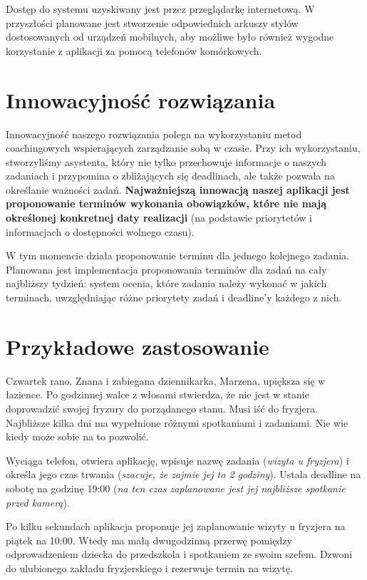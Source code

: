 \documentclass[pdflatex,11pt]{aghdpl}
\begin{document}
Dostęp do systemu uzyskiwany jest przez przeglądarkę internetową. W przyszłości planowane jest stworzenie odpowiednich arkuszy stylów dostosowanych od urządzeń mobilnych, aby możliwe było również wygodne korzystanie z aplikacji za pomocą telefonów komórkowych.

\section{Innowacyjność rozwiązania}

Innowacyjność naszego rozwiązania polega na wykorzystaniu metod coachingowych wspierających zarządzanie sobą w czasie. Przy ich wykorzystaniu, stworzyliśmy asystenta, który nie tylko przechowuje informacje o naszych zadaniach i przypomina o zbliżających się deadlinach, ale także pozwala na określanie ważności zadań. \textbf{Najważniejszą innowacją naszej aplikacji jest proponowanie terminów wykonania obowiązków, które nie mają określonej konkretnej daty realizacji} (na podstawie priorytetów i informacjach o dostępności wolnego czasu).

W tym momencie działa proponowanie terminu dla jednego kolejnego zadania. Planowana jest implementacja proponowania terminów dla zadań na cały najbliższy tydzień: system ocenia, które zadania należy wykonać w jakich terminach, uwzględniając różne priorytety zadań i deadline'y każdego z nich.

\section{Przykładowe zastosowanie}

Czwartek rano. Znana i zabiegana dziennikarka, Marzena, upiększa się w łazience. Po godzinnej walce z włosami stwierdza, że nie jest w stanie doprowadzić swojej fryzury do porządanego stanu. Musi iść do fryzjera. Najbliższe kilka dni ma wypełnione różnymi spotkaniami i zadaniami. Nie wie kiedy może sobie na to pozwolić.

Wyciąga telefon, otwiera aplikację, wpisuje nazwę zadania (\textit{wizyta u fryzjera}) i określa jego czas trwania (\textit{szacuje, że zajmie jej to 2 godziny}). Ustala deadline na sobotę na godzinę 19:00 (\textit{na ten czas zaplanowane jest jej najbliższe spotkanie przed kamerą}).

Po kilku sekundach aplikacja proponuje jej zaplanowanie wizyty u fryzjera na piątek na 10:00. Wtedy ma małą dwugodzinną przerwę pomiędzy odprowadzeniem dziecka do przedszkola i spotkaniem ze swoim szefem. Dzwoni do ulubionego zakładu fryzjerskiego i rezerwuje termin na wizytę.
\end{document}
